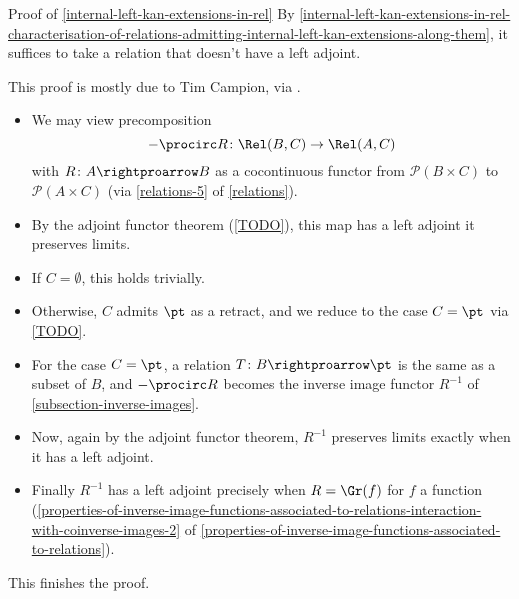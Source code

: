 \begin{Proof}{Proof of \cref{internal-left-kan-extensions-in-rel}}%
    By \cref{internal-left-kan-extensions-in-rel-characterisation-of-relations-admitting-internal-left-kan-extensions-along-them}, it suffices to take a relation that doesn't have a left adjoint.

    This proof is mostly due to Tim Campion, via \cite{MO460693}.
    \begin{itemize}
        \item We may view precomposition
            \[
                -\procirc R%
                \colon%
                \Rel(B,C)%
                \to%
                \Rel(A,C)%
            \]%
            with $R\colon A\rightproarrow B$ as a cocontinuous functor from $\mathcal{P}(B\times C)$ to $\mathcal{P}(A\times C)$ (via \cref{relations-5} of \cref{relations}).
        \item By the adjoint functor theorem (\cref{TODO}), this map has a left adjoint \textiff it preserves limits.
        \item If $C=\emptyset$, this holds trivially.
        \item Otherwise, $C$ admits $\pt$ as a retract, and we reduce to the case $C=\pt$ via \cref{TODO}.
        \item For the case $C=\pt$, a relation $T\colon B\rightproarrow\pt$ is the same as a subset of $B$, and $-\procirc R$ becomes the inverse image functor $R^{-1}$ of \cref{subsection-inverse-images}.
        \item Now, again by the adjoint functor theorem, $R^{-1}$ preserves limits exactly when it has a left adjoint.
        \item Finally $R^{-1}$ has a left adjoint precisely when $R=\Gr(f)$ for $f$ a function (\cref{properties-of-inverse-image-functions-associated-to-relations-interaction-with-coinverse-images-2} of \cref{properties-of-inverse-image-functions-associated-to-relations}).
    \end{itemize}
    This finishes the proof.
\end{Proof}
